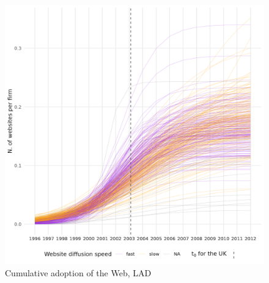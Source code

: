 \documentclass[
  authoryear,
  preprint,
  3p]{elsarticle}
\begin{document}
\begin{figure}[H]

{\centering \includegraphics[width=1\textwidth,height=\textheight]{../../outputs/s/lad_per_firm_all.png}

}

\caption{\label{s_lad_uk}Cumulative adoption of the Web, LAD}

\end{figure}%
\end{document}

